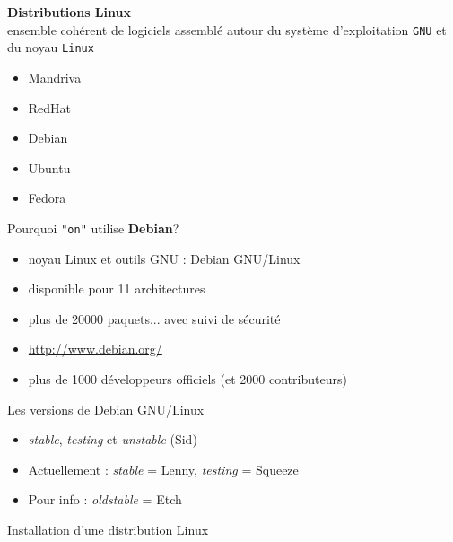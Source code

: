 \documentclass[french]{beamer}
\begin{document}
\begin{frame}
\textbf{Distributions Linux} \\
ensemble cohérent de logiciels assemblé autour du système d'exploitation
\texttt{GNU} et du noyau \texttt{Linux}
    \begin{itemize}
    \item Mandriva 
    \item RedHat
    \item Debian
    \item Ubuntu
    \item Fedora
    \end{itemize}
\end{frame}

\begin{frame}
Pourquoi \texttt{"on"} utilise \textbf{Debian}?

\begin{itemize}
\item noyau Linux et outils GNU : Debian GNU/Linux
\item disponible pour 11 architectures
\item plus de 20000 paquets... avec suivi de sécurité
\item \url{http://www.debian.org/}
\item plus de 1000 développeurs officiels (et 2000 contributeurs)
\end{itemize}
\end{frame}

\begin{frame}
Les versions de Debian GNU/Linux
\begin{itemize}
\item \textit{stable}, \textit{testing} et \textit{unstable} (Sid)
\item Actuellement : \textit{stable} = Lenny, \textit{testing} = Squeeze
\item Pour info : \textit{oldstable} = Etch
\end{itemize}
\end{frame}


\begin{frame}
\begin{center}
Installation d'une distribution Linux
\end{center}
\end{frame}
\end{document}
